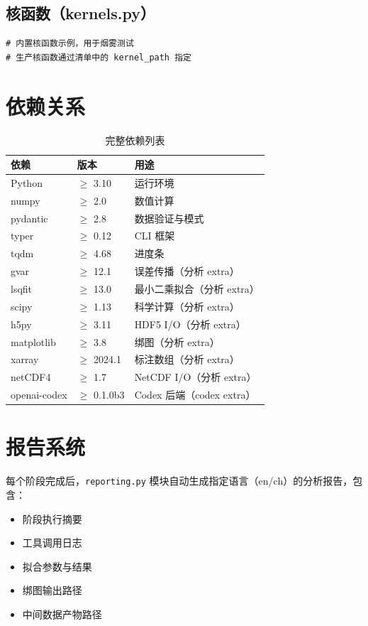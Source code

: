 \documentclass[12pt,a4paper]{ctexart}
\begin{document}
\subsection{核函数（kernels.py）}

\begin{lstlisting}[style=pycode]
# 内置核函数示例，用于烟雾测试
# 生产核函数通过清单中的 kernel_path 指定
\end{lstlisting}

\section{依赖关系}

\begin{table}[h]
\centering
\begin{tabular}{@{}lll@{}}
\toprule
\textbf{依赖}    & \textbf{版本}    & \textbf{用途} \\
\midrule
Python           & $\ge$ 3.10       & 运行环境 \\
numpy            & $\ge$ 2.0        & 数值计算 \\
pydantic         & $\ge$ 2.8        & 数据验证与模式 \\
typer            & $\ge$ 0.12       & CLI 框架 \\
tqdm             & $\ge$ 4.68       & 进度条 \\
gvar             & $\ge$ 12.1       & 误差传播（分析 extra）\\
lsqfit           & $\ge$ 13.0       & 最小二乘拟合（分析 extra）\\
scipy            & $\ge$ 1.13       & 科学计算（分析 extra）\\
h5py             & $\ge$ 3.11       & HDF5 I/O（分析 extra）\\
matplotlib       & $\ge$ 3.8        & 绑图（分析 extra）\\
xarray           & $\ge$ 2024.1     & 标注数组（分析 extra）\\
netCDF4          & $\ge$ 1.7        & NetCDF I/O（分析 extra）\\
openai-codex     & $\ge$ 0.1.0b3    & Codex 后端（codex extra）\\
\bottomrule
\end{tabular}
\caption{完整依赖列表}
\end{table}

\section{报告系统}

每个阶段完成后，\texttt{reporting.py} 模块自动生成指定语言（en/ch）的分析报告，包含：
\begin{itemize}[itemsep=2pt]
    \item 阶段执行摘要
    \item 工具调用日志
    \item 拟合参数与结果
    \item 绑图输出路径
    \item 中间数据产物路径
\end{itemize}
\end{document}
